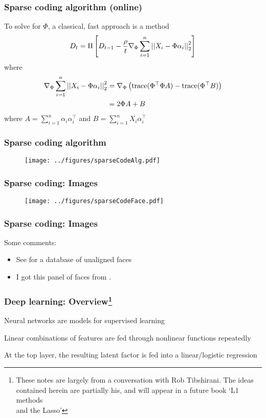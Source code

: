 \documentclass[12pt]{beamer}
\begin{document}
\begin{frame}[fragile]
\frametitle{Sparse coding algorithm (online)}
To solve for $\Phi$, a classical, fast approach is a  method
\[
D_t = \Pi\left[ D_{t-1} - \frac{\rho}{t} \nabla_\Phi \sum_{i=1}^n\left|\left| X_i - \Phi\alpha_i \right|\right|_2^2 \right]
\]
where
\begin{align*}
 \nabla_\Phi \sum_{i=1}^n\left|\left| X_i - \Phi\alpha_i \right|\right|_2^2 
 & = 
 \nabla_\Phi \left( \textrm{trace}(\Phi^{\top}\Phi A) -  \textrm{trace}(\Phi^{\top} B)\right) \\
 & = 
 2\Phi A + B
\end{align*}
where $A =\sum_{i=1}^n  \alpha_i\alpha_i^{\top}$ and $B = \sum_{i=1}^n  X_i\alpha_i^{\top}$
\end{frame}
\begin{frame}[fragile]
\frametitle{Sparse coding algorithm}
\begin{figure}
\centering
\texttt{[image: ../figures/sparseCodeAlg.pdf]}
\end{figure}
\end{frame}



\begin{frame}[fragile]
\frametitle{Sparse coding: Images}
\begin{figure}
\centering
\texttt{[image: ../figures/sparseCodeFace.pdf]}
\end{figure}
\end{frame}

\begin{frame}[fragile]
\frametitle{Sparse coding: Images}
Some comments:
\begin{itemize}

\item See  for a database of unaligned faces
\item I got this panel of faces from .  


\end{itemize}

\end{frame}


\begin{frame}[fragile]
\frametitle{Deep learning: Overview\footnote{These notes are largely from a conversation with Rob Tibshirani.  The ideas 
contained herein are partially his, and will appear in a future book  `L1 methods \\and the Lasso'}}
Neural networks are models for supervised learning

\vsp
Linear combinations of features are fed through nonlinear functions repeatedly

\vsp
At the top layer, the resulting latent factor is fed into a linear/logistic regression
\end{frame}
\end{document}
